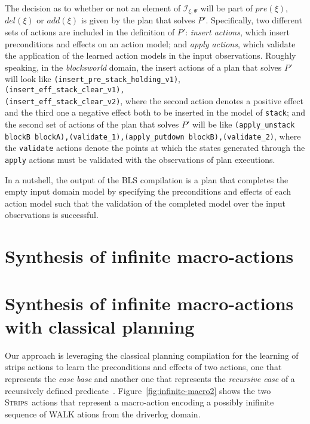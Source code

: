 \documentclass[letterpaper]{article} %
\newcommand{\strips}{\textsc{Strips}}     %
\begin{document}
The decision as to whether or not an element of ${\mathcal I}_{\xi,\Psi}$ will be part of $pre(\xi)$, $del(\xi)$ or $add(\xi)$ is given by the plan that solves $P'$. Specifically, two different sets of actions are included in the definition of $P'$: \emph{insert actions}, which insert preconditions and effects on an action model; and \emph{apply actions}, which validate the application of the learned action models in the input observations. Roughly speaking, in the \emph{blocksworld} domain, the insert actions of a plan that solves $P'$ will look like {\tt{\footnotesize(insert\_pre\_stack\_holding\_v1)}},\\
{\tt{\footnotesize(insert\_eff\_stack\_clear\_v1),\\
(insert\_eff\_stack\_clear\_v2)}}, where the second action denotes a positive effect and the third one a negative effect both to be inserted in the model of {\tt{\small stack}}; and the second set of actions of the plan that solves $P'$ will be like {\tt{\small (apply\_unstack blockB blockA),(validate\_1),(apply\_putdown blockB),(validate\_2)}}, where the {\tt {\small validate}} actions denote the points at which the states generated through the {\tt {\small apply}} actions must be validated with the observations of plan executions.

In a nutshell, the output of the BLS compilation is a plan that completes the empty input domain model by specifying the preconditions and effects of each action model such that the validation of the completed model over the input observations is successful.


\section{Synthesis of infinite macro-actions}
\label{sec:infinite}


\section{Synthesis of infinite macro-actions with classical planning}
\label{sec:asPlanning}
Our approach is leveraging the classical planning compilation for the learning of strips actions to learn the preconditions and effects of two actions, one that represents the {\em case base} and another one that represents the {\em recursive case} of a recursively defined predicate~\cite{aineto2018learning}. Figure~\ref{fig:infinite-macro2} shows the two \strips\ actions that represent a macro-action encoding a possibly inifinite sequence of WALK ations from the driverlog domain.
   
\end{document}

